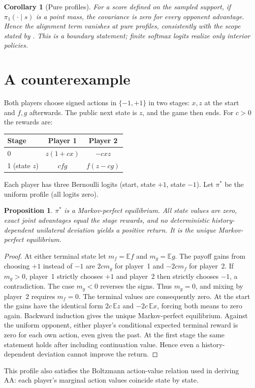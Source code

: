 \documentclass[11pt]{article}
\newtheorem{proposition}{Proposition}
\newtheorem{corollary}{Corollary}
\theoremstyle{remark}
\newcommand{\E}{\mathbb{E}}
\begin{document}
\begin{corollary}[Pure profiles]\label{cor:pure}
For a score defined on the sampled support, if $\pi_1(\cdot\mid s)$ is a point mass, the covariance is zero for every opponent advantage. Hence the alignment term vanishes at pure profiles, consistently with the scope stated by \citet{duque2026issue}. This is a boundary statement; finite softmax logits realize only interior policies.
\end{corollary}

\section{A counterexample}\label{sec:counter}

Both players choose signed actions in $\{-1,+1\}$ in two stages: $x,z$ at the start and $f,g$ afterwards. The public next state is $z$, and the game then ends. For $c>0$ the rewards are:
\begin{center}
\begin{tabular}{lcc}\toprule
Stage & Player 1 & Player 2\\\midrule
0 & $z(1+cx)$ & $-cxz$\\
1 (state $z$) & $cfg$ & $f(z-cg)$\\\bottomrule
\end{tabular}
\end{center}
Each player has three Bernoulli logits (start, state $+1$, state $-1$). Let $\pi^*$ be the uniform profile (all logits zero).

\begin{proposition}\label{prop:nash}
$\pi^*$ is a Markov-perfect equilibrium. All state values are zero, exact joint advantages equal the stage rewards, and no deterministic history-dependent unilateral deviation yields a positive return. It is the unique Markov-perfect equilibrium.
\end{proposition}

\begin{proof}
At either terminal state let $m_f=\E f$ and $m_g=\E g$. The payoff gains from choosing $+1$ instead of $-1$ are $2c m_g$ for player~1 and $-2c m_f$ for player~2. If $m_g>0$, player~1 strictly chooses $+1$ and player~2 then strictly chooses $-1$, a contradiction. The case $m_g<0$ reverses the signs. Thus $m_g=0$, and mixing by player~2 requires $m_f=0$. The terminal values are consequently zero. At the start the gains have the identical form $2c\,\E z$ and $-2c\,\E x$, forcing both means to zero again. Backward induction gives the unique Markov-perfect equilibrium. Against the uniform opponent, either player's conditional expected terminal reward is zero for each own action, even given the past. At the first stage the same statement holds after including continuation value. Hence even a history-dependent deviation cannot improve the return.
\end{proof}
This profile also satisfies the Boltzmann action-value relation used in deriving AA: each player's marginal action values coincide state by state.
\end{document}
